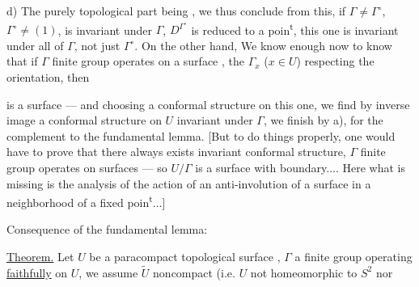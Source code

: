  d) The purely topological part being   , we thus conclude from this, if $\Gamma\ne\Gamma^\circ$, $\Gamma^\circ\ne(1)$,     is invariant under $\Gamma$,   $D^{\Gamma^\circ}$ is reduced to a poin\textsuperscript{t}, this one is invariant under all of $\Gamma$, not just $\Gamma^\circ$. On the other hand, We know enough now to know that if $\Gamma$ finite group operates on a surface  , the $\Gamma_x$ ($x\in U$) respecting the orientation, then 



is a surface ---  and choosing a conformal structure on this one, we find by inverse image a conformal structure on $U$ invariant under $\Gamma$,   we finish by a),  for the complement to the fundamental lemma. [But to do things properly, one would have to prove that there always exists invariant conformal structure,  $\Gamma$ finite group operates on surfaces   --- so $U/\Gamma$ is a surface with boundary.... Here what is missing is the analysis of the action of an anti-involution of a surface in a neighborhood of a fixed poin\textsuperscript{t}...]


Consequence of the fundamental lemma:

\uline{Theorem.} Let $U$ be a paracompact topological surface , $\Gamma$ a finite group operating \uline{faithfully} on $U$, we assume $\widetilde U$  noncompact (i.e. $U$ not homeomorphic to $S^2$ nor


